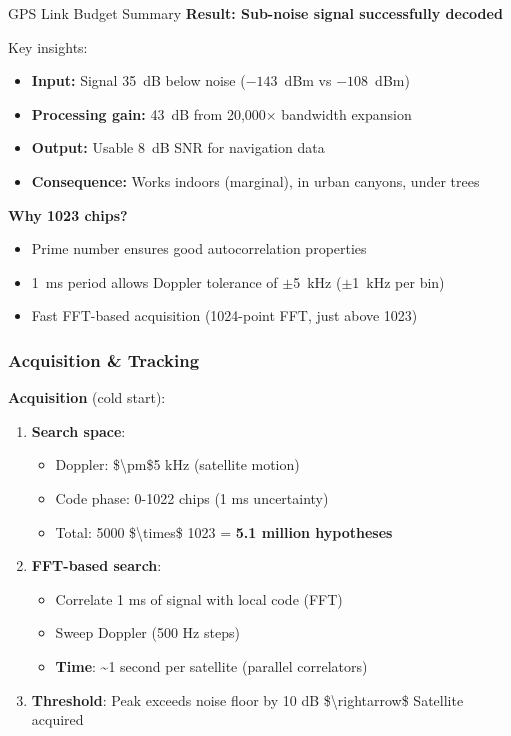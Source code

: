 \begin{calloutbox}{GPS Link Budget Summary}
\textbf{Result: Sub-noise signal successfully decoded}

Key insights:
\begin{itemize}
\item \textbf{Input:} Signal 35~dB below noise ($-143$~dBm vs $-108$~dBm)
\item \textbf{Processing gain:} 43~dB from 20,000$\times$ bandwidth expansion
\item \textbf{Output:} Usable 8~dB SNR for navigation data
\item \textbf{Consequence:} Works indoors (marginal), in urban canyons, under trees
\end{itemize}

\textbf{Why 1023 chips?}
\begin{itemize}
\item Prime number ensures good autocorrelation properties
\item 1~ms period allows Doppler tolerance of $\pm$5~kHz ($\pm$1~kHz per bin)
\item Fast FFT-based acquisition (1024-point FFT, just above 1023)
\end{itemize}
\end{calloutbox}

\subsubsection{Acquisition \& Tracking}\label{acquisition-tracking}

\textbf{Acquisition} (cold start):

\begin{enumerate}
\def\labelenumi{\arabic{enumi}.}
\tightlist
\item
  \textbf{Search space}:

  \begin{itemize}
  \tightlist
  \item
    Doppler: \$\textbackslash pm\$5 kHz (satellite motion)
  \item
    Code phase: 0-1022 chips (1 ms uncertainty)
  \item
    Total: 5000 \$\textbackslash times\$ 1023 = \textbf{5.1 million
    hypotheses}
  \end{itemize}
\item
  \textbf{FFT-based search}:

  \begin{itemize}
  \tightlist
  \item
    Correlate 1 ms of signal with local code (FFT)
  \item
    Sweep Doppler (500 Hz steps)
  \item
    \textbf{Time}: \textasciitilde1 second per satellite (parallel
    correlators)
  \end{itemize}
\item
  \textbf{Threshold}: Peak exceeds noise floor by 10 dB
  \$\textbackslash rightarrow\$ Satellite acquired
\end{enumerate}

